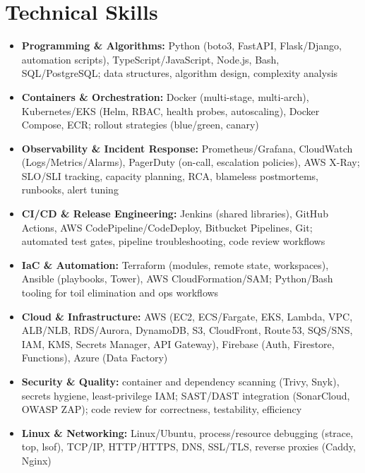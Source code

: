 \documentclass[10pt,a4paper]{article}
\begin{document}
\section*{Technical Skills}
\begin{itemize}
  \item \textbf{Programming \& Algorithms:} Python (boto3, FastAPI, Flask/Django, automation scripts), TypeScript/JavaScript, Node.js, Bash, SQL/PostgreSQL; data structures, algorithm design, complexity analysis
  \item \textbf{Containers \& Orchestration:} Docker (multi-stage, multi-arch), Kubernetes/EKS (Helm, RBAC, health probes, autoscaling), Docker Compose, ECR; rollout strategies (blue/green, canary)
  \item \textbf{Observability \& Incident Response:} Prometheus/Grafana, CloudWatch (Logs/Metrics/Alarms), PagerDuty (on-call, escalation policies), AWS X-Ray; SLO/SLI tracking, capacity planning, RCA, blameless postmortems, runbooks, alert tuning
  \item \textbf{CI/CD \& Release Engineering:} Jenkins (shared libraries), GitHub Actions, AWS CodePipeline/CodeDeploy, Bitbucket Pipelines, Git; automated test gates, pipeline troubleshooting, code review workflows
  \item \textbf{IaC \& Automation:} Terraform (modules, remote state, workspaces), Ansible (playbooks, Tower), AWS CloudFormation/SAM; Python/Bash tooling for toil elimination and ops workflows
  \item \textbf{Cloud \& Infrastructure:} AWS (EC2, ECS/Fargate, EKS, Lambda, VPC, ALB/NLB, RDS/Aurora, DynamoDB, S3, CloudFront, Route\,53, SQS/SNS, IAM, KMS, Secrets Manager, API Gateway), Firebase (Auth, Firestore, Functions), Azure (Data Factory)
  \item \textbf{Security \& Quality:} container and dependency scanning (Trivy, Snyk), secrets hygiene, least-privilege IAM; SAST/DAST integration (SonarCloud, OWASP ZAP); code review for correctness, testability, efficiency
  \item \textbf{Linux \& Networking:} Linux/Ubuntu, process/resource debugging (strace, top, lsof), TCP/IP, HTTP/HTTPS, DNS, SSL/TLS, reverse proxies (Caddy, Nginx)
\end{itemize}

\end{document}
